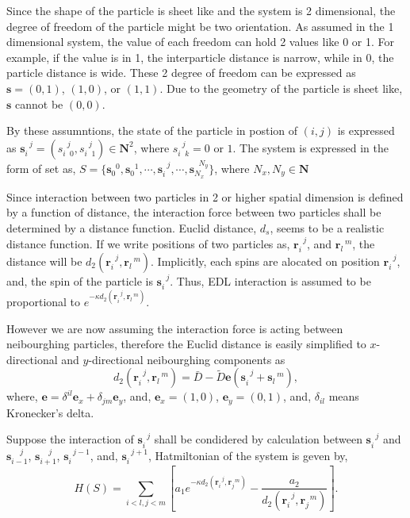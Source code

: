\documentclass{article}
\begin{document}
Since the shape of the particle is sheet like and the system is 2 dimensional, the degree of freedom of the particle 
might be two orientation. 
As assumed in the 1 dimensional system, the value of each freedom can hold 2 values like 0 or 1.
For example, if the value is in 1, the interparticle distance is narrow, while in 0, the particle distance is wide.
These 2 degree of freedom can be expressed as $\bm{s} = (0, 1)$, $(1, 0)$, or $(1, 1)$.
Due to the geometry of the particle is sheet like, $\bm{s}$ cannot be $(0, 0)$.

By these assumntions, the state of the particle in postion of $(i, j)$ is expressed as 
$\bm{s}_{i}^{\mspace{10mu}j} = (s_{i\mspace{10mu}0}^{\mspace{10mu}j}, s_{i\mspace{10mu}1}^{\mspace{10mu}j}) \in \mathbf{N}^2$, 
where $s_{i\mspace{10mu}k}^{\mspace{10mu}j} = 0$ or $1$.
The system is expressed in the form of set as, 
$S = \{\bm{s}_{0}^{\mspace{10mu}0}, \bm{s}_{0}^{\mspace{10mu}1}, \cdots, \bm{s}_{i}^{\mspace{10mu}j},\cdots,  \bm{s}_{N_x}^{\mspace{10mu}N_y}\}$, 
where $N_x, N_y \in \mathbf{N}$

Since interaction between two particles in 2 or higher spatial dimension is defined by a function of distance, the interaction force between two particles
 shall be determined by a distance function.
Euclid distance, $d_s$, seems to be a realistic distance function. 
If we write positions of two particles as, $\bm{r}_{i}^{\mspace{10mu}j}$, and $\bm{r}_{l}^{\mspace{10mu}m}$, the distance will be 
$d_2 (\bm{r}_{i}^{\mspace{10mu}j}, \bm{r}_{l}^{\mspace{10mu}m})$. 
Implicitly, each spins are alocated on position $\bm{r}_{i}^{\mspace{10mu}j}$, and, the spin of the particle is $\bm{s}_{i}^{\mspace{10mu}j}$.
Thus, EDL interaction is assumed to be proportional to $e^{-\kappa d_2 (\bm{r}_{i}^{\mspace{10mu}j}, \bm{r}_{l}^{\mspace{10mu}m})}$.

However we are now assuming the interaction force is acting between neibourghing particles, therefore the Euclid distance is easily simplified to
 $x$-directional and $y$-directional neibourghing components as 
\begin{equation}
 d_2 (\bm{r}_{i}^{\mspace{10mu}j}, \bm{r}_{l}^{\mspace{10mu}m}) = \bar{D} - \tilde{D} \bm{e}(\bm{s}_{i}^{\mspace{10mu}j} + \bm{s}_{l}^{\mspace{10mu}m}),   \label{Euclid_dist}
\end{equation}
where, $\bm{e} = \delta^{il}\bm{e}_x +  \delta_{jm}\bm{e}_y$, and, $\bm{e}_x = (1, 0)$, $\bm{e}_y = (0, 1)$, and, $\delta_{il}$ means Kronecker's delta.

Suppose the interaction of $\bm{s}_{i}^{\mspace{10mu}j}$ shall be condidered by calculation between $\bm{s}_{i}^{\mspace{10mu}j}$ and $\bm{s}_{i-1}^{\mspace{20mu}j}$, 
$\bm{s}_{i+1}^{\mspace{20mu}j}$, $\bm{s}_{i}^{\mspace{10mu}j-1}$, and, $\bm{s}_{i}^{\mspace{10mu}j+1}$, Hatmiltonian of the system is geven by,
\begin{equation}
 H(S) = \sum_{i<l, j<m} \left[
		a_1 e^{-\kappa d_2 (\bm{r}_{i}^{\mspace{10mu}j}, \bm{r}_{j}^{\mspace{10mu}m})} 
		- \frac{a_2}{d_2 (\bm{r}_{i}^{\mspace{10mu}j}, \bm{r}_{j}^{\mspace{10mu}m})} 
	      \right].
\end{equation}
\end{document}
